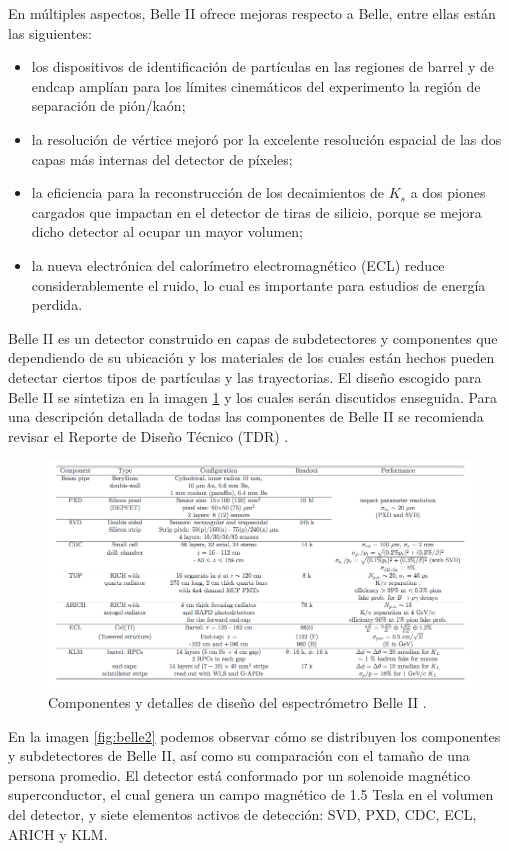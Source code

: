 En múltiples aspectos, Belle II ofrece mejoras respecto a Belle, entre ellas están las siguientes:
\begin{itemize}
    \item los dispositivos de identificación de partículas en las regiones de barrel y de endcap amplían para los límites cinemáticos del experimento la región de separación de pión/kaón;
    \item la resolución de vértice mejoró por la excelente resolución espacial de las dos capas más internas del detector de píxeles;
    \item la eficiencia para la reconstrucción de los decaimientos de \(K_{s}\) a dos piones cargados que impactan en el detector de tiras de silicio, porque se mejora dicho detector al ocupar un mayor volumen;
    \item la nueva electrónica del calorímetro electromagnético (ECL) reduce considerablemente el ruido, lo cual es importante para estudios de energía perdida.
    
\end{itemize}
\newpage
Belle II es un detector construido en capas de subdetectores y componentes que dependiendo de su ubicación y los materiales de los cuales están hechos pueden detectar ciertos tipos de partículas y las trayectorias. El diseño escogido para Belle II se sintetiza en la imagen \ref{fig:belle2Config} y los cuales serán discutidos enseguida. Para una descripción detallada de todas las componentes de Belle II se recomienda revisar el Reporte de Diseño Técnico (TDR) \cite{abe2010belle}.

\begin{figure}[h]
    \centering
    \includegraphics[scale=.5]{Images/BelleIIConfig.png}
    \caption{\small Componentes y detalles de diseño del espectrómetro Belle II \cite{abe2010belle}.}
    \label{fig:belle2Config}
\end{figure}
 En la imagen \ref{fig:belle2} podemos observar cómo se distribuyen los componentes y subdetectores de Belle II, así como su comparación con el tamaño de una persona promedio. El detector está conformado por un solenoide magnético superconductor,
el cual genera un campo magnético de 1.5 Tesla en el volumen del
detector, y siete elementos activos de detección: SVD, PXD, CDC, ECL, ARICH y
KLM.
 
